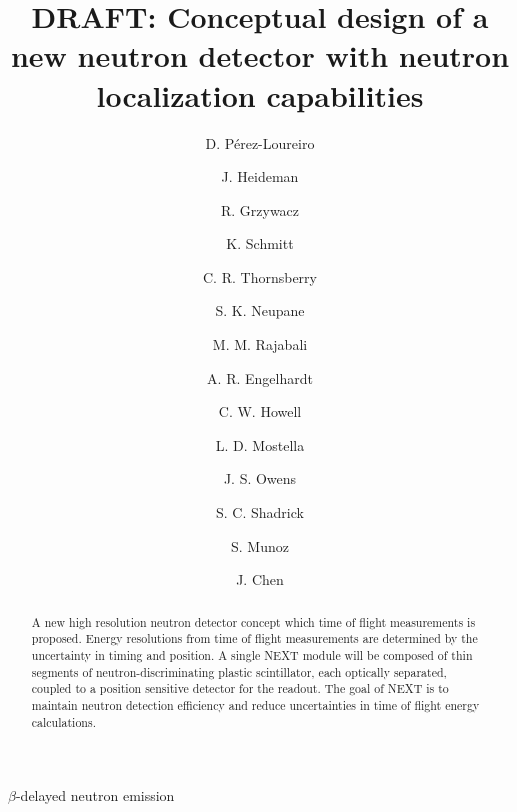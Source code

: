 \documentclass[preprint,3p,twocolumn]{elsarticle}
\begin{document}
\begin{frontmatter}

\title{DRAFT: Conceptual design of a new neutron detector with neutron localization capabilities}


\author[mymainaddress]{D. P\'erez-Loureiro}
\author[mymainaddress]{J. Heideman}


\author[mymainaddress,ORNLaddress]{R. Grzywacz}

\author[mymainaddress]{K. Schmitt}
\author[mymainaddress]{C. R. Thornsberry}
\author[mymainaddress]{S. K. Neupane}

\author[TTUaddress]{M. M. Rajabali}
\author[TTUaddress]{A. R. Engelhardt}
\author[TTUaddress]{C. W. Howell}
\author[TTUaddress]{L. D. Mostella}
\author[TTUaddress]{J. S. Owens}
\author[TTUaddress]{S. C. Shadrick}

\author[JINPAaddress]{S. Munoz}


\author[mymainaddress]{J. Chen}



\address[mymainaddress]{Department of Physics and Astronomy,  University of Tennessee, Knoxville, Tennessee , 37996 USA}
\address[ORNLaddress]{Physics Division, Oak Ridge National Laboratory, Oak Ridge TN 37831 USA}
\address[TTUaddress]{Department of Physics Tennessee Technological University, Cookeville, Tennessee, 38505, USA}
\address[JINPAaddress]{Joint Institute for Nuclear Physics and Applications, Oak Ridge TN 37831 USA}


\begin{abstract}
A new high resolution neutron detector concept which time of flight measurements is proposed. Energy resolutions from time of flight measurements are determined by the uncertainty in timing and position. A single NEXT module will be composed of thin segments of neutron-discriminating plastic scintillator, each optically separated, coupled to a position sensitive detector for the readout. The goal of NEXT is to maintain neutron detection efficiency and reduce uncertainties in time of flight energy calculations.
\end{abstract}

\begin{keyword}
$\beta$-delayed neutron emission
\end{keyword}

\end{frontmatter}
\end{document}
